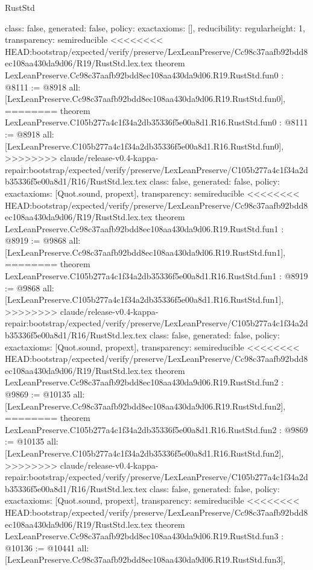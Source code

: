 \begin{lexlean}{RustStd}
\begin{coremodule}
{\begin{coremodule}
{{{  class: false,
  generated: false,
  policy: exact{axioms: []},
  reducibility: regular{height: 1},
  transparency: semireducible
}
<<<<<<<< HEAD:bootstrap/expected/verify/preserve/LexLeanPreserve/Cc98c37aafb92bdd8ec108aa430da9d06/R19/RustStd.lex.tex
theorem LexLeanPreserve.Cc98c37aafb92bdd8ec108aa430da9d06.R19.RustStd.fun0 : @8111 := @8918 {
  all: [LexLeanPreserve.Cc98c37aafb92bdd8ec108aa430da9d06.R19.RustStd.fun0],
========
theorem LexLeanPreserve.C105b277a4c1f34a2db35336f5e00a8d1.R16.RustStd.fun0 : @8111 := @8918 {
  all: [LexLeanPreserve.C105b277a4c1f34a2db35336f5e00a8d1.R16.RustStd.fun0],
>>>>>>>> claude/release-v0.4-kappa-repair:bootstrap/expected/verify/preserve/LexLeanPreserve/C105b277a4c1f34a2db35336f5e00a8d1/R16/RustStd.lex.tex
  class: false,
  generated: false,
  policy: exact{axioms: [Quot.sound, propext]},
  transparency: semireducible
}
<<<<<<<< HEAD:bootstrap/expected/verify/preserve/LexLeanPreserve/Cc98c37aafb92bdd8ec108aa430da9d06/R19/RustStd.lex.tex
theorem LexLeanPreserve.Cc98c37aafb92bdd8ec108aa430da9d06.R19.RustStd.fun1 : @8919 := @9868 {
  all: [LexLeanPreserve.Cc98c37aafb92bdd8ec108aa430da9d06.R19.RustStd.fun1],
========
theorem LexLeanPreserve.C105b277a4c1f34a2db35336f5e00a8d1.R16.RustStd.fun1 : @8919 := @9868 {
  all: [LexLeanPreserve.C105b277a4c1f34a2db35336f5e00a8d1.R16.RustStd.fun1],
>>>>>>>> claude/release-v0.4-kappa-repair:bootstrap/expected/verify/preserve/LexLeanPreserve/C105b277a4c1f34a2db35336f5e00a8d1/R16/RustStd.lex.tex
  class: false,
  generated: false,
  policy: exact{axioms: [Quot.sound, propext]},
  transparency: semireducible
}
<<<<<<<< HEAD:bootstrap/expected/verify/preserve/LexLeanPreserve/Cc98c37aafb92bdd8ec108aa430da9d06/R19/RustStd.lex.tex
theorem LexLeanPreserve.Cc98c37aafb92bdd8ec108aa430da9d06.R19.RustStd.fun2 : @9869 := @10135 {
  all: [LexLeanPreserve.Cc98c37aafb92bdd8ec108aa430da9d06.R19.RustStd.fun2],
========
theorem LexLeanPreserve.C105b277a4c1f34a2db35336f5e00a8d1.R16.RustStd.fun2 : @9869 := @10135 {
  all: [LexLeanPreserve.C105b277a4c1f34a2db35336f5e00a8d1.R16.RustStd.fun2],
>>>>>>>> claude/release-v0.4-kappa-repair:bootstrap/expected/verify/preserve/LexLeanPreserve/C105b277a4c1f34a2db35336f5e00a8d1/R16/RustStd.lex.tex
  class: false,
  generated: false,
  policy: exact{axioms: [Quot.sound, propext]},
  transparency: semireducible
}
<<<<<<<< HEAD:bootstrap/expected/verify/preserve/LexLeanPreserve/Cc98c37aafb92bdd8ec108aa430da9d06/R19/RustStd.lex.tex
theorem LexLeanPreserve.Cc98c37aafb92bdd8ec108aa430da9d06.R19.RustStd.fun3 : @10136 := @10441 {
  all: [LexLeanPreserve.Cc98c37aafb92bdd8ec108aa430da9d06.R19.RustStd.fun3],
}}}}}}
\end{coremodule}}
\end{coremodule}
\end{lexlean}

